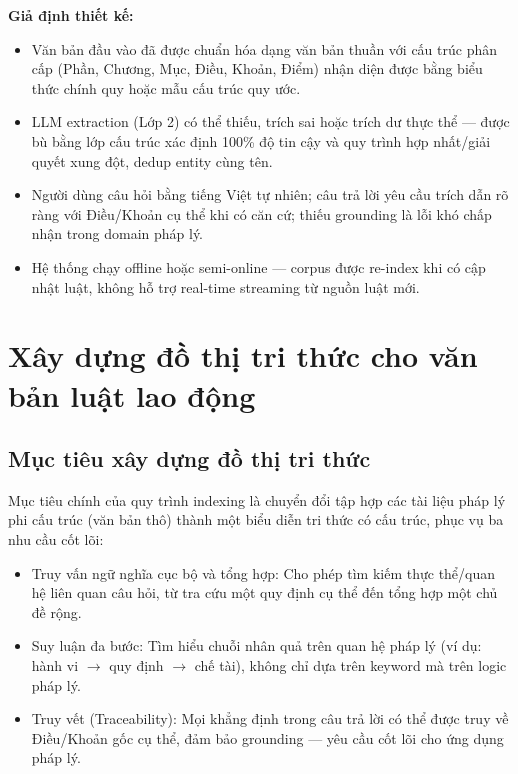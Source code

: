 \documentclass[../DoAn.tex]{subfiles}
\begin{document}
\textbf{Giả định thiết kế:}
\begin{itemize}[nosep, leftmargin=*]
    \item Văn bản đầu vào đã được chuẩn hóa dạng văn bản thuần với cấu trúc phân cấp (Phần, Chương, Mục, Điều, Khoản, Điểm) nhận diện được bằng biểu thức chính quy hoặc mẫu cấu trúc quy ước.
    \item LLM extraction (Lớp 2) có thể thiếu, trích sai hoặc trích dư thực thể --- được bù bằng lớp cấu trúc xác định 100\% độ tin cậy và quy trình hợp nhất/giải quyết xung đột, dedup entity cùng tên.
    \item Người dùng câu hỏi bằng tiếng Việt tự nhiên; câu trả lời yêu cầu trích dẫn rõ ràng với Điều/Khoản cụ thể khi có căn cứ; thiếu grounding là lỗi khó chấp nhận trong domain pháp lý.
    \item Hệ thống chạy offline hoặc semi-online --- corpus được re-index khi có cập nhật luật, không hỗ trợ real-time streaming từ nguồn luật mới.
\end{itemize}

\section{Xây dựng đồ thị tri thức cho văn bản luật lao động}
\label{section:3.2}

\subsection{Mục tiêu xây dựng đồ thị tri thức}
\label{subsection:3.2.1}

Mục tiêu chính của quy trình indexing là chuyển đổi tập hợp các tài liệu pháp lý phi cấu trúc (văn bản thô) thành một biểu diễn tri thức có cấu trúc, phục vụ ba nhu cầu cốt lõi:

\begin{itemize}[nosep, leftmargin=*]
    \item Truy vấn ngữ nghĩa cục bộ và tổng hợp: Cho phép tìm kiếm thực thể/quan hệ liên quan câu hỏi, từ tra cứu một quy định cụ thể đến tổng hợp một chủ đề rộng.
    \item Suy luận đa bước: Tìm hiểu chuỗi nhân quả trên quan hệ pháp lý (ví dụ: hành vi $\rightarrow$ quy định $\rightarrow$ chế tài), không chỉ dựa trên keyword mà trên logic pháp lý.
    \item Truy vết (Traceability): Mọi khẳng định trong câu trả lời có thể được truy về Điều/Khoản gốc cụ thể, đảm bảo grounding --- yêu cầu cốt lõi cho ứng dụng pháp lý.
\end{itemize}
\end{document}
